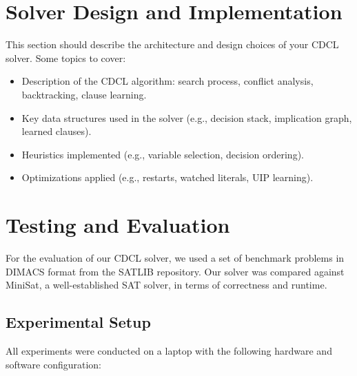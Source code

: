 \documentclass[a4paper,12pt]{article}
\begin{document}

\section{Solver Design and Implementation}
\label{sec:design}
This section should describe the architecture and design choices of your CDCL solver. Some topics to cover:
\begin{itemize}
    \item Description of the CDCL algorithm: search process, conflict analysis, backtracking, clause learning.
    \item Key data structures used in the solver (e.g., decision stack, implication graph, learned clauses).
    \item Heuristics implemented (e.g., variable selection, decision ordering).
    \item Optimizations applied (e.g., restarts, watched literals, UIP learning).
\end{itemize}


\section{Testing and Evaluation}

For the evaluation of our CDCL solver, we used a set of benchmark problems in DIMACS
format from the SATLIB repository. Our solver was compared against MiniSat, a
well-established SAT solver, in terms of correctness and runtime.

\subsection{Experimental Setup}
All experiments were conducted on a laptop with the following hardware and software configuration:
\end{document}

